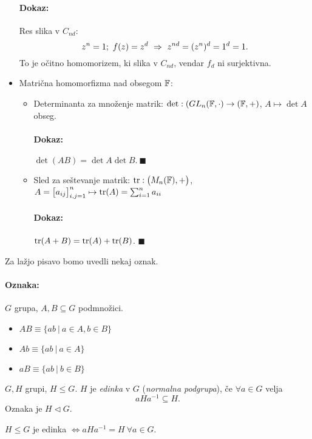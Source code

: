 \begin{itemize}
{		\paragraph{Dokaz:} Res slika v $C_{nd}$:
		\[
			z^n = 1;\ f(z) = z^d\ \Rightarrow\ z^{nd} = (z^n)^d = 1^d = 1.
		\] To je o\v citno homomorizem, ki slika v $C_{nd}$, vendar $f_d$ ni surjektivna.}
	\item{Matri\v cna homomorfizma nad obsegom $\mathbb{F}$:
		\begin{itemize}
			\item{Determinanta za mno\v zenje matrik: $\det: (GL_n (\mathbb{F}, \cdot) \to (\mathbb{F}, +)$, $A \mapsto \det A$ obseg.
				\paragraph{Dokaz:} $\det (AB) = \det A \det B.\ \blacksquare$}
			\item{Sled za se\v stevanje matrik: $\operatorname{tr} : \big(M_n(\mathbb{F}), +\big)$, $A = \big[a_{ij}\big]^n_{i,j = 1} \mapsto \operatorname{tr} (A) = \sum_{i=1}^n a_{ii}$
				\paragraph{Dokaz:} $\operatorname{tr}(A + B) = \operatorname{tr}(A) + \operatorname{tr}(B)$. $\blacksquare$}
		\end{itemize}}
\end{itemize}

\ni Za la\v zjo pisavo bomo uvedli nekaj oznak.

\paragraph{Oznaka:} $G$ grupa, $A,B \subseteq G$ podmno\v zici.
\begin{itemize}
	\item{$AB \equiv \{ab\ |\ a \in A, b \in B\}$}
	\item{$Ab \equiv \{ab\ |\ a \in A\}$}
	\item{$aB \equiv \{ab\ |\ b \in B\}$}
\end{itemize}

\begin{defin}
	$G, H$ grupi, $H \leq G$. $H$ je \emph{edinka} v $G$ (\emph{normalna podgrupa}), \v ce $\forall a \in G$ velja
	\[
		a H a^{-1} \subseteq H.
	\]
	Oznaka je $H \lhd G$.
\end{defin}

\begin{lema}
	$H \leq G$ je edinka $\iff a H a^{-1} = H\ \forall a \in G$.
\end{lema}

